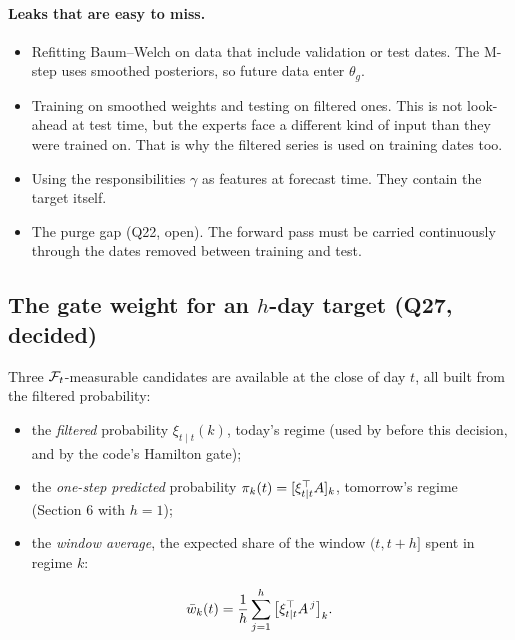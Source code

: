 \paragraph{Leaks that are easy to miss.}
\begin{itemize}
  \item Refitting Baum--Welch on data that include validation or test dates. The M-step uses smoothed posteriors, so future data enter $\theta_g$.
  \item Training on smoothed weights and testing on filtered ones. This is not look-ahead at test time, but the experts face a different kind of input than they were trained on. That is why the filtered series is used on training dates too.
  \item Using the responsibilities $\gamma$ as features at forecast time. They contain the target itself.
  \item The purge gap (Q22, open). The forward pass must be carried continuously through the dates removed between training and test.
\end{itemize}

\subsection{The gate weight for an $h$-day target (Q27, decided)}\label{sec:predfilt}
Three $\mathcal{F}_t$-measurable candidates are available at the close of day $t$, all built from the filtered probability:
\begin{itemize}
  \item the \emph{filtered} probability $\xi_{t\mid t}(k)$, today's regime (used by  before this decision, and by the code's Hamilton gate);
  \item the \emph{one-step predicted} probability $\pi_k(t)=[\xi_{t\mid t}^{\top} A]_k$, tomorrow's regime (Section 6 with $h=1$);
  \item the \emph{window average}, the expected share of the window $(t,t+h]$ spent in regime $k$:
\end{itemize}
\begin{equation}\label{eq:wbar}
\bar w_k(t)=\frac1h\sum_{j=1}^{h}\big[\xi_{t\mid t}^{\top} A^{\,j}\big]_k.
\end{equation}

